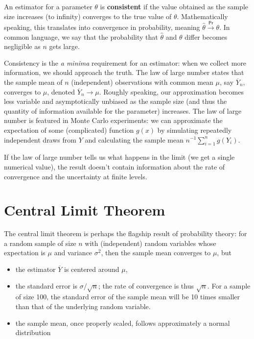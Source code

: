 \documentclass[
  11pt,
  letterpaper,
]{book}
\providecommand{\tightlist}{%
  \setlength{\itemsep}{0pt}\setlength{\parskip}{0pt}}
\theoremstyle{definition}
\theoremstyle{definition}
\theoremstyle{definition}
\theoremstyle{remark}
\begin{document}
An estimator for a parameter \(\theta\) is \textbf{consistent} if the value obtained as the sample size increases (to infinity) converges to the true value of \(\theta\). Mathematically speaking, this translates into convergence in probability, meaning \(\hat{\theta} \stackrel{\mathsf{Pr}}{\to} \theta\). In common language, we say that the probability that \(\hat{\theta}\) and \(\theta\) differ becomes negligible as \(n\) gets large.

Consistency is the \emph{a minima} requirement for an estimator: when we collect more information, we should approach the truth. The law of large number states that the sample mean of \(n\) (independent) observations with common mean \(\mu\), say \(\overline{Y}_n\), converges to \(\mu\), denoted \(\overline{Y}_n \rightarrow \mu\). Roughly speaking, our approximation becomes less variable and asymptotically unbiased as the sample size (and thus the quantity of information available for the parameter) increases. The law of large number is featured in Monte Carlo experiments: we can approximate the expectation of some (complicated) function \(g(x)\) by simulating repeatedly independent draws from \(Y\) and calculating the sample mean \(n^{-1} \sum_{i=1}^n g(Y_i)\).

If the law of large number tells us what happens in the limit (we get a single numerical value), the result doesn't contain information about the rate of convergence and the uncertainty at finite levels.

\hypertarget{CLT}{%
\section{Central Limit Theorem}\label{CLT}}

The central limit theorem is perhaps the flagship result of probability theory: for a random sample of size \(n\) with (independent) random variables whose expectation is \(\mu\) and variance \(\sigma^2\), then the sample mean converges to \(\mu\), but

\begin{itemize}
\tightlist
\item
  the estimator \(\overline{Y}\) is centered around \(\mu\),
\item
  the standard error is \(\sigma/\sqrt{n}\); the rate of convergence is thus \(\sqrt{n}\). For a sample of size 100, the standard error of the sample mean will be 10 times smaller than that of the underlying random variable.
\item
  the sample mean, once properly scaled, follows approximately a normal distribution
\end{itemize}
\end{document}
